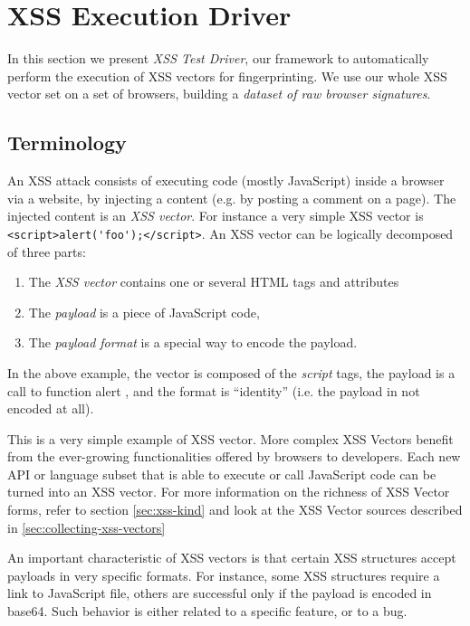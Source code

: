 \documentclass[10pt]{IEEEtran}
\begin{document}
\section{XSS Execution Driver}
\label{sec:xss-vector-testing}
In this section we present \emph{XSS Test Driver}, our framework to automatically perform 
the execution of XSS vectors for fingerprinting. We use our whole XSS vector set on a
 set of browsers, building a \emph{dataset of raw browser signatures}. 
 
\subsection{Terminology}
An XSS attack consists of executing code (mostly JavaScript) inside a browser via a website, by injecting a content (e.g. by posting a comment on a page).
The injected content is an \emph{XSS vector}.
For instance a very simple XSS vector is \verb*|<script>alert('foo');</script>|.
An XSS vector can be logically decomposed of three parts:
\begin{enumerate}
\item The \emph{XSS vector} contains one or several HTML tags and attributes
\item The \emph{payload} is a piece of JavaScript code,
\item The \emph{payload format} is a special way to encode the payload.
\end{enumerate}




In the above example, the vector is composed of the \textit{script} tags,
the payload is a call to function alert , and the format is ``identity'' 
(i.e. the payload in not encoded at all).




This is a very simple example of XSS vector.  More complex XSS Vectors benefit from the ever-growing functionalities offered by browsers to developers. 
Each new API or language subset that is able to execute or call JavaScript code can be turned into an 
XSS vector. For more information on the richness of XSS Vector forms, refer to section \ref{sec:xss-kind} 
and look at the XSS Vector sources described in \ref{sec:collecting-xss-vectors}




An important characteristic of XSS vectors is that certain XSS structures accept 
payloads in very specific formats. For instance, some XSS structures require a link 
to JavaScript file, others are successful only if the payload is encoded in base64. 
Such behavior is either related to a specific feature, or to a bug. 
\end{document}
